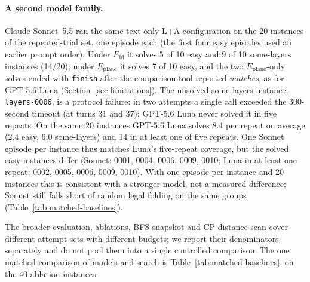 \paragraph{A second model family.} Claude Sonnet~5.5 ran the same text-only L+A configuration on
the 20 instances of the repeated-trial set, one episode each (the first four easy episodes used an
earlier prompt order). Under $E_{\mathrm{id}}$ it solves 5 of 10 easy and 9 of 10 some-layers
instances (14/20); under $E_{\mathrm{plane}}$ it solves 7 of 10 easy, and the two
$E_{\mathrm{plane}}$-only solves ended with \texttt{finish} after the comparison tool reported
\emph{matches}, as for GPT-5.6 Luna (Section~\ref{sec:limitations}). The unsolved some-layers
instance, \texttt{layers-0006}, is a protocol failure: in two attempts a single call exceeded the
300-second timeout (at turns 31 and 37); GPT-5.6 Luna never solved it in five repeats. On the same
20 instances GPT-5.6 Luna solves 8.4 per repeat on average (2.4 easy, 6.0 some-layers) and 14 in at
least one of five repeats. One Sonnet episode per instance thus matches Luna's five-repeat
coverage, but the solved easy instances differ (Sonnet: 0001, 0004, 0006, 0009, 0010; Luna in at
least one repeat: 0002, 0005, 0006, 0009, 0010). With one episode per instance and 20 instances
this is consistent with a stronger model, not a measured difference; Sonnet still falls short of
random legal folding on the same groups (Table~\ref{tab:matched-baselines}).

\label{sec:results-difficulty}
\label{sec:results-threats}
The broader evaluation, ablations, BFS snapshot and CP-distance scan cover different attempt
sets with different budgets; we report their denominators separately and do not pool them into
a single controlled comparison. The one matched comparison of models and search is
Table~\ref{tab:matched-baselines}, on the 40 ablation instances.
